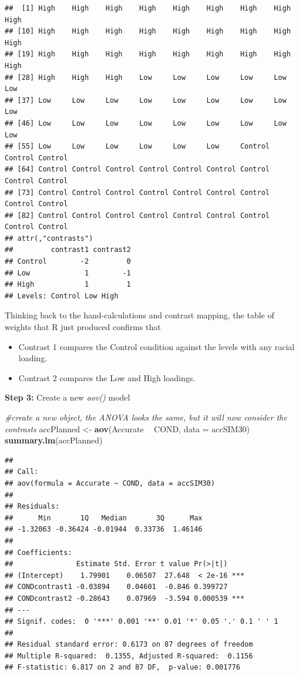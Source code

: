 \documentclass[
  english,
]{book}
\newenvironment{Shaded}{\begin{snugshade}}{\end{snugshade}}
\newcommand{\CommentTok}[1]{\textcolor[rgb]{0.56,0.35,0.01}{\textit{#1}}}
\newcommand{\DataTypeTok}[1]{\textcolor[rgb]{0.13,0.29,0.53}{#1}}
\newcommand{\KeywordTok}[1]{\textcolor[rgb]{0.13,0.29,0.53}{\textbf{#1}}}
\newcommand{\NormalTok}[1]{#1}
\newcommand{\OperatorTok}[1]{\textcolor[rgb]{0.81,0.36,0.00}{\textbf{#1}}}
\newcommand{\StringTok}[1]{\textcolor[rgb]{0.31,0.60,0.02}{#1}}
\providecommand{\tightlist}{%
  \setlength{\itemsep}{0pt}\setlength{\parskip}{0pt}}
\begin{document}
\begin{verbatim}
##  [1] High    High    High    High    High    High    High    High    High   
## [10] High    High    High    High    High    High    High    High    High   
## [19] High    High    High    High    High    High    High    High    High   
## [28] High    High    High    Low     Low     Low     Low     Low     Low    
## [37] Low     Low     Low     Low     Low     Low     Low     Low     Low    
## [46] Low     Low     Low     Low     Low     Low     Low     Low     Low    
## [55] Low     Low     Low     Low     Low     Low     Control Control Control
## [64] Control Control Control Control Control Control Control Control Control
## [73] Control Control Control Control Control Control Control Control Control
## [82] Control Control Control Control Control Control Control Control Control
## attr(,"contrasts")
##         contrast1 contrast2
## Control        -2         0
## Low             1        -1
## High            1         1
## Levels: Control Low High
\end{verbatim}

Thinking back to the hand-calculations and contrast mapping, the table of weights that R just produced confirms that

\begin{itemize}
\tightlist
\item
  Contrast 1 compares the Control condition against the levels with any racial loading.\\
\item
  Contrast 2 compares the Low and High loadings.
\end{itemize}

\textbf{Step 3:} Create a new \emph{aov()} model

\begin{Shaded}
\begin{Highlighting}[]
\CommentTok{#create a new object, the ANOVA looks the same, but it will now consider the contrasts}
\NormalTok{accPlanned <-}\StringTok{ }\KeywordTok{aov}\NormalTok{(Accurate }\OperatorTok{~}\StringTok{ }\NormalTok{COND, }\DataTypeTok{data =}\NormalTok{ accSIM30)}
\KeywordTok{summary.lm}\NormalTok{(accPlanned)}
\end{Highlighting}
\end{Shaded}

\begin{verbatim}
## 
## Call:
## aov(formula = Accurate ~ COND, data = accSIM30)
## 
## Residuals:
##      Min       1Q   Median       3Q      Max 
## -1.32063 -0.36424 -0.01944  0.33736  1.46146 
## 
## Coefficients:
##               Estimate Std. Error t value Pr(>|t|)    
## (Intercept)    1.79901    0.06507  27.648  < 2e-16 ***
## CONDcontrast1 -0.03894    0.04601  -0.846 0.399727    
## CONDcontrast2 -0.28643    0.07969  -3.594 0.000539 ***
## ---
## Signif. codes:  0 '***' 0.001 '**' 0.01 '*' 0.05 '.' 0.1 ' ' 1
## 
## Residual standard error: 0.6173 on 87 degrees of freedom
## Multiple R-squared:  0.1355, Adjusted R-squared:  0.1156 
## F-statistic: 6.817 on 2 and 87 DF,  p-value: 0.001776
\end{verbatim}
\end{document}
